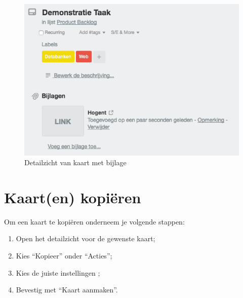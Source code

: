 \begin{figure}[H]
	\centering
	\includegraphics[scale=0.5]{./afbeeldingen/bijlage_kaart.png}
	\caption{Detailzicht van kaart met bijlage}
	\label{fig:bijlage_kaart}	
\end{figure} 

\section{Kaart(en) kopi\"eren}

Om een kaart te kopi\"eren onderneem je volgende stappen:
\begin{enumerate}[nolistsep]
	\item Open het detailzicht voor de gewenste kaart;
	\item Kies ``Kopieer'' onder ``Acties'';
	\item Kies de juiste instellingen ;
	\item Bevestig met ``Kaart aanmaken''.
\end{enumerate}

